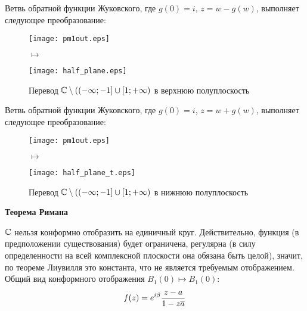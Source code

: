 \FloatBarrier
\Example
Ветвь обратной функции Жуковского, где $g(0) = i$, $z = w - g(w)$, выполняет
следующее преобразование:
\\
\begin{figure}[h!]
        \begin{minipage}[c]{0.45\textwidth}
        \centering
        \texttt{[image: pm1out.eps]}
    \end{minipage}
    \begin{minipage}[c]{0.1\textwidth}
        \centering
        \LARGE{$\mapsto$}
    \end{minipage}
    \begin{minipage}[c]{0.45\textwidth}
        \centering
        \texttt{[image: half\_plane.eps]}
    \end{minipage}
    \label{fig:24.16}
    \caption{Перевод $\mathbb{C} \setminus ((-\infty;-1]\cup[1;+\infty)$ в верхнюю полуплоскость}
\end{figure}
\FloatBarrier
\Example
Ветвь обратной функции Жуковского, где $g(0) = i$, $z = w + g(w)$, выполняет
следующее преобразование:
\\
\begin{figure}[h!]
        \begin{minipage}[c]{0.45\textwidth}
        \centering
        \texttt{[image: pm1out.eps]}
    \end{minipage}
    \begin{minipage}[c]{0.1\textwidth}
        \centering
        \LARGE{$\mapsto$}
    \end{minipage}
    \begin{minipage}[c]{0.45\textwidth}
        \centering
        \texttt{[image: half\_plane\_t.eps]}
    \end{minipage}
    \label{fig:24.17}
    \caption{Перевод $\mathbb{C} \setminus ((-\infty;-1]\cup[1;+\infty)$ в нижнюю полуплоскость}
\end{figure}
\FloatBarrier
\begin{center}
    \textbf{Теорема Римана}
\end{center}
$\mathbb{C}$ нельзя конформно отобразить на единичный круг. Действительно, функция (в
предположении существования) будет ограничена, регулярна (в силу определенности
на всей комплексной плоскости она обязана быть целой), значит, по теореме
Лиувилля это константа, что не является требуемым отображением.
\theorem
Общий вид конформного отображения $B_1(0) \mapsto B_1(0)$:
\begin{equation}\label{(24.4)}
    f(z) = e^{i\beta}\frac{z-a}{1-z\overline{a}}
\end{equation}
